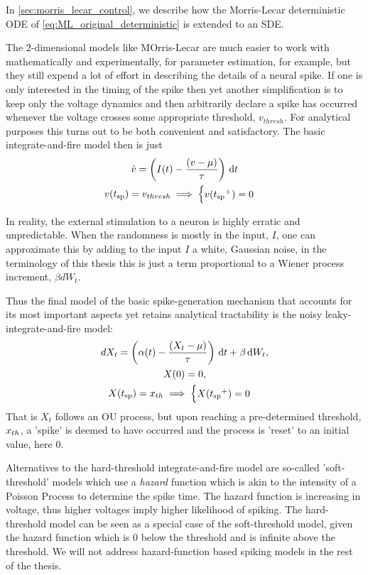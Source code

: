 In \cref{sec:morris_lecar_control}, we describe how the Morris-Lecar
deterministic ODE of \cref{eq:ML_original_deterministic} is extended to an SDE.   
 
The 2-dimensional models like MOrris-Lecar are much easier to work with
mathematically and experimentally, for parameter estimation, for example, but
they still expend a lot of effort in describing the details of a neural spike.
If one is only interested in the timing of the spike then yet another
simplification is to keep only the voltage dynamics and then arbitrarily declare
a spike has occurred whenever the voltage crosses some appropriate threshold,
$v_{thresh}$. For analytical purposes this turns out to be both convenient and
satisfactory. The basic integrate-and-fire model then is just
\begin{equation}
\begin{gathered}
\dot{v} = \left(I(t) - \frac{(v - {\mu })}{{ \tau }} \right) \, \mathrm{d} t 
\\
v({ t_{\textrm{sp} } }) = v_{thresh} \implies  
\begin{cases}
v({ t_{\textrm{sp} } }^+) = 0 &  
\end{cases}
\end{gathered}
\label{eq:deterministic_IF}
\end{equation}

In reality, the external stimulation to a neuron is highly erratic and
unpredictable. When the randomness is mostly in the input, $I$,
one can approximate this by adding to the input $I$ a white, Gaussian
noise, in the terminology of this thesis this is just a term proportional to
a Wiener process increment, $\beta dW_t$.

Thus the final model of the basic spike-generation mechanism that accounts for
its most important aspects yet retains analytical tractability is the noisy
leaky-integrate-and-fire model:
\begin{equation}
\begin{gathered}
dX_t = \left(\alpha(t) - \frac{(X_t - {\mu })}{{ \tau }} \right) \, \mathrm{d} t + \beta \, \mathrm{d} W_t,
\\
X(0) = 0,
\\
X({ t_{\textrm{sp} } }) = { x_{th} } \implies  
\begin{cases}
X({ t_{\textrm{sp} } }^+) = 0 &  
\end{cases}
\end{gathered}
\label{eq:X_evolution_uo}
\end{equation}
That is $X_t$ follows an OU process, but upon reaching a pre-determined
threshold, ${ x_{th} }$, a 'spike' is deemed to have occurred and the process is
'reset' to an initial value, here $0$.

Alternatives to the hard-threshold integrate-and-fire model are so-called
'soft-threshold' models which use a {\sl hazard} function which is akin to the
intensity of a Poisson Process to determine the spike time. The hazard function
is increasing in voltage, thus higher voltages imply higher likelihood of
spiking. The hard-threshold model can be seen as a special case of the
soft-threshold model, given the hazard function which is 0 below the threshold
and is infinite above the threshold. We will not address hazard-function based
spiking models in the rest of the thesis. 
